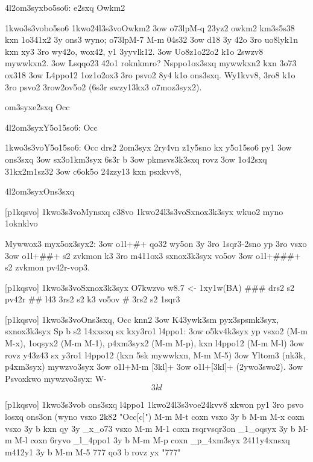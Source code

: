 \24l2om3syx{bo5so6: e2sxq Owkm2}

  \p1kwo3s3vo{bo5so6}
  \p1kwo24l3s3vo{Owkm2}
  \s3ow \3o73lp{M-q} 23yz2 owkm2 km3s5s38 kxn 1o341x2 3y ons3 wyno; \3o73lp{M-7 M-m} 04s32
  \s3ow d18 3y 42o 3ro uo8lyk1n kxn xy3 3ro wy42o, wox42, y1 3yyvlk12.
  \s3ow Uo8z1o22o2 k1o 2swzv8 mywwkxn2.
  \s3ow Lsqqo23 42o1 roknkmro?  Nsppo1ox3sxq mywwkxn2 kxn 3o73 ox318
  \s3ow L4ppo12 1oz1o2ox3 3ro psvo2 8y4 k1o ons3sxq.  Wy1kvv8, 3ro8
    k1o 3ro psvo2 3row2ov5o2 (6s3r swzy13kx3 o7moz3syx2).


\2om3syx{e2sxq Occ}

\24l2om3syx{Y5o15so6: Occ}

  \p1kwo3s3vo{Y5o15so6: Occ}
  drs2 2om3syx 2ry4vn z1y5sno kx y5o15so6 py1 
  \s3ow ons3sxq
  \s3ow sx3o1km3syx 6s3r b
  \s3ow pkmsvs3k3sxq rovz
  \s3ow 1o42sxq 31kx2m1sz32
  \s3ow c6ok5o 24zzy13
  kxn psxkvv8, 

\24l2om3syx{Ons3sxq}

[p1kqsvo]
  \p1kwo3s3vo{Mynsxq c38vo}
  \p1kwo24l3s3vo{Sxnox3k3syx wkuo2 myno 1oknklvo}

  Mywwox3 myx5ox3syx2:
  \s3ow \5o1l+#+ qo32 wy5on 3y 3ro 1sqr3-2sno yp 3ro vsxo
  \s3ow \5o1l+##+ s2 zvkmon k3 3ro m411ox3 sxnox3k3syx vo5ov
  \s3ow \5o1l+###+ s2 zvkmon pv42r-vop3.

[p1kqsvo]
  \p1kwo3s3vo{Sxnox3k3syx O7kwzvo}
    w8.7 <- 1xy1w(BA)
### drs2 s2 pv42r
    ## l43 3rs2 s2 k3 vo5ov
                         # 3rs2 s2 1sqr3


[p1kqsvo]
  \p1kwo3s3vo{Ons3sxq, Occ knn2}
  \s3ow K43ywk3sm pyx3spsmk3syx, sxnox3k3syx
  Sp b s2 14xxsxq sx kxy3ro1 l4ppo1:
  \s3ow o5kv4k3syx yp vsxo2 (M-m M-x), 1oqsyx2 (M-m M-1), p4xm3syx2
    (M-m M-p), kxn l4ppo12 (M-m M-l)
  \s3ow rovz y43z43 sx y3ro1 l4ppo12 (kxn 5sk mywwkxn, M-m M-5)
  \s3ow Yltom3 (nk3k, p4xm3syx) mywzvo3syx
    \s3ow \5o1l+M-m [3kl]+ 
    \s3ow \5o1l+[3kl]+ (2ywo3swo2).
  \s3ow Psvoxkwo mywzvo3syx: W-\[3kl\]

[p1kqsvo]
  \p1kwo3s3vo{b ons3sxq l4ppo1}
  \p1kwo24l3s3vo{e24kvv8 xkwon py1 3ro psvo losxq ons3on}
  (wyno vsxo 2k82 "Occ[c]")
M-m M-t        coxn vsxo 3y b
M-m M-x        coxn vsxo 3y b 
               kxn qy 3y _x_o73 vsxo
M-m M-1        coxn rsqrvsqr3on _1_oqsyx 3y b
M-m M-l        coxn 6ryvo _l_4ppo1 3y b
M-m M-p        coxn _p_4xm3syx 2411y4xnsxq
               m412y1 3y b
M-m M-5 777    qo3 b rovz yx "777"

